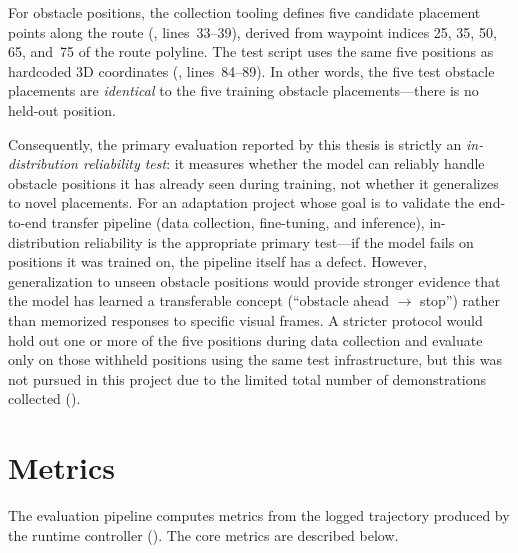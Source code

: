 For obstacle positions, the collection tooling defines five candidate placement points along the route (, lines~33--39), derived from waypoint indices 25, 35, 50, 65, and~75 of the route polyline. The test script uses the same five positions as hardcoded 3D coordinates (, lines~84--89). In other words, the five test obstacle placements are \emph{identical} to the five training obstacle placements---there is no held-out position.

Consequently, the primary evaluation reported by this thesis is strictly an \emph{in-distribution reliability test}: it measures whether the model can reliably handle obstacle positions it has already seen during training, not whether it generalizes to novel placements. For an adaptation project whose goal is to validate the end-to-end transfer pipeline (data collection, fine-tuning, and inference), in-distribution reliability is the appropriate primary test---if the model fails on positions it was trained on, the pipeline itself has a defect. However, generalization to unseen obstacle positions would provide stronger evidence that the model has learned a transferable concept (``obstacle ahead $\rightarrow$ stop'') rather than memorized responses to specific visual frames. A stricter protocol would hold out one or more of the five positions during data collection and evaluate only on those withheld positions using the same test infrastructure, but this was not pursued in this project due to the limited total number of demonstrations collected ().

\section{Metrics}
\label{sec:metrics}
The evaluation pipeline computes metrics from the logged trajectory produced by the runtime controller (). The core metrics are described below.


